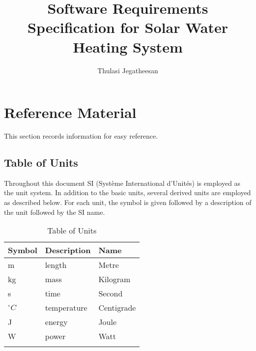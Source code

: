\documentclass[12pt]{article}
\title{Software Requirements Specification for Solar Water Heating System}
\author{Thulasi Jegatheesan}
\begin{document}
\maketitle
\tableofcontents
\newpage
\section{Reference Material}
\label{Sec:RM}
This section records information for easy reference.
\subsection{Table of Units}
\label{Sec:ToU}
Throughout this document SI (Syst\`{e}me International d'Unit\'{e}s) is employed as the unit system. In addition to the basic units, several derived units are employed as described below. For each unit, the symbol is given followed by a description of the unit followed by the SI name.
\begin{longtable}{l l l}
\toprule
Symbol & Description & Name
\\
\midrule
m & length & Metre
\\
kg & mass & Kilogram
\\
s & time & Second
\\
${}^{\circ}C$ & temperature & Centigrade
\\
J & energy & Joule
\\
W & power & Watt
\\
\bottomrule
\caption{Table of Units}
\label{Table:ToU}
\end{longtable}
\end{document}
